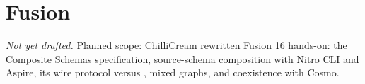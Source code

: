 \chapter{Fusion}
\label{ch:fusion}

\emph{Not yet drafted.} Planned scope: ChilliCream rewritten Fusion 16 hands-on: the Composite Schemas specification, source-schema composition with Nitro CLI and Aspire, its wire protocol versus , mixed graphs, and coexistence with Cosmo.

% 
